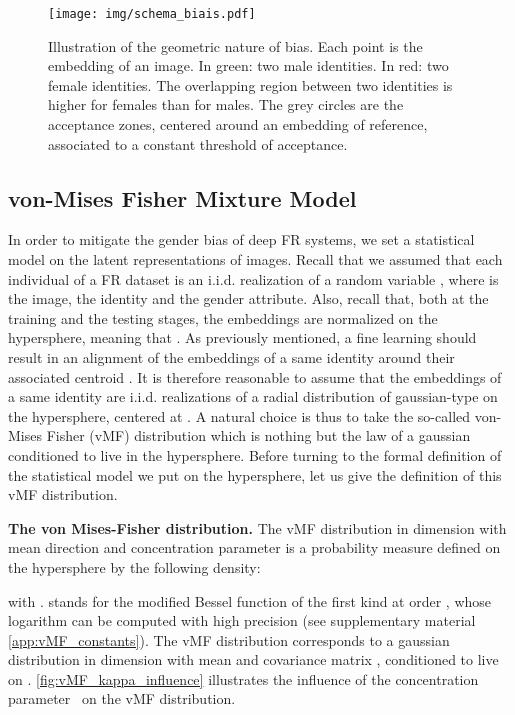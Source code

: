\documentclass[nohyperref]{article}
\theoremstyle{plain}
\theoremstyle{definition}
\theoremstyle{remark}
\begin{document}
\begin{figure}[ht!]
    \centering
    \texttt{[image: img/schema\_biais.pdf]}
    \caption{Illustration of the geometric nature of bias. Each point is the embedding of an image. In green: two male identities. In red: two female identities. The overlapping region between two identities is higher for females than for males. The grey circles are the acceptance zones, centered around an embedding of reference, associated to a constant threshold  of acceptance.}
    \label{fig:schema_biais}
    \vspace{-0.3cm}
\end{figure}



\subsection{von-Mises Fisher Mixture Model}\label{subsec:vMF_Loss}




In order to mitigate the gender bias of deep FR systems, we set a statistical model on the latent representations of images. Recall that we assumed that each individual of a FR dataset is an i.i.d. realization of a random variable , where  is the image,  the identity and  the gender attribute. Also, recall that, both at the training and the testing stages, the embeddings are normalized on the hypersphere, meaning that . As previously mentioned, a fine learning should result in an alignment of the embeddings  of a same identity  around their associated centroid . It is therefore reasonable to assume that the embeddings of a same identity are i.i.d. realizations of a radial distribution of gaussian-type on the hypersphere, centered at . A natural choice is thus to take the so-called von-Mises Fisher (vMF) distribution which is nothing but the law of a gaussian conditioned to live in the hypersphere. Before turning to the formal definition of the statistical model we put on the hypersphere, let us give the definition of this vMF distribution. 

{\bf The von Mises-Fisher distribution.} The vMF distribution in dimension  with mean direction  and concentration parameter  is a probability measure defined on the hypersphere  by the following density:

with .  stands for the modified Bessel function of the first kind at order , whose logarithm can be computed with high precision (see supplementary material \ref{app:vMF_constants}). The vMF distribution corresponds to a gaussian distribution in dimension  with mean  and
covariance matrix , conditioned to live on .
\autoref{fig:vMF_kappa_influence} illustrates the influence of the concentration parameter~ on the vMF distribution.
\end{document}
